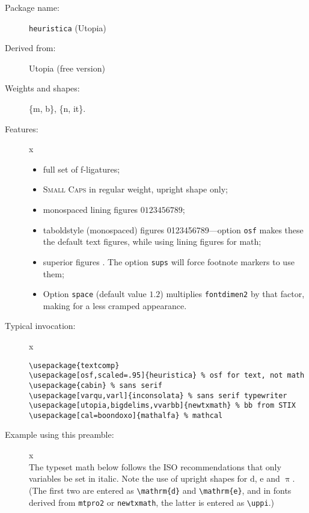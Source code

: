 \documentclass{article}
\def\Pr{\ensuremath{\mathbb{P}}}
\def\d{\mathrm{d}}
\begin{document}
\thispagestyle{empty}
\begin{description}
\item[Package name:] {\tt heuristica} (Utopia)
\item[Derived from:] Utopia (free version)
\item[Weights and shapes:]  \{m, b\}, \{n, it\}. 
\item[Features:]{\color{white}x}\\[-15pt]  
\begin{itemize}
\item
full set of f-ligatures;
\item \textsc{Small Caps} in regular weight, upright shape only;
\item monospaced lining figures $0123456789$;
\item taboldstyle (monospaced) figures 0123456789---option {\tt osf} makes these the default text figures, while using lining figures for math; 
\item superior figures {}. The option {\tt sups} will force footnote markers to use them;
\item
Option {\tt space} (default value $1.2$) multiplies \verb|fontdimen2| by that factor, making for a less cramped appearance.
\end{itemize}
\item[Typical invocation:]{\color{white}x}
\begin{verbatim}
\usepackage{textcomp}
\usepackage[osf,scaled=.95]{heuristica} % osf for text, not math
\usepackage{cabin} % sans serif
\usepackage[varqu,varl]{inconsolata} % sans serif typewriter
\usepackage[utopia,bigdelims,vvarbb]{newtxmath} % bb from STIX
\usepackage[cal=boondoxo]{mathalfa} % mathcal
\end{verbatim}
\item[Example using this preamble:]{\color{white}x}\\[6pt]
\lipsum[1]
\def\Pr{\ensuremath{\mathbb{P}}}
\def\d{\mathrm{d}}
The typeset math below follows the ISO recommendations that only variables
be set in italic. Note the use of upright shapes for $\d$, $\mathrm{e}$
and $\uppi$. (The first two are entered as \verb|\mathrm{d}| and
\verb|\mathrm{e}|, and in fonts derived from {\tt mtpro2} or {\tt newtxmath},
 the latter is entered as \verb|\uppi|.)


\end{description}
\end{document}
